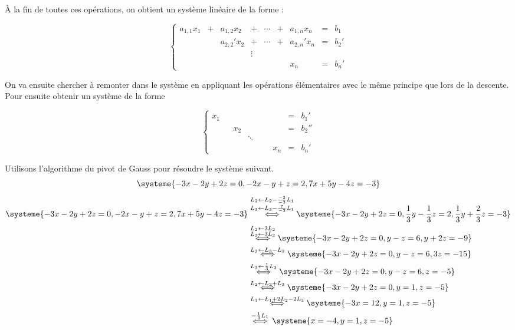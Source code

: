 \`A la fin de toutes ces opérations, on obtient un système linéaire de la forme :

\[
\left\{
\begin{array}{rrrrrrrrr}
	a_{1,1} x_1 & + & a_{1,2} x_2  & + & \cdots & + & a_{1,n} x_n  & = & b_1  \\
	            &   & a_{2,2}' x_2 & + & \cdots & + & a_{2,n}' x_n & = & b_2' \\
	            &   &              & \vdots  &  &   &              &   &      \\
	            &   &              &   &        &   & x_n          & = & b_n'
\end{array}
\right.
\]

On va ensuite chercher à remonter dans le système en appliquant les opérations élémentaires avec le même principe que lors de la descente. Pour ensuite obtenir un système de la forme 

\[
\left\{
\begin{array}{ccccccccc}
	x_1 &  &     &        &  &  &     & = & b_1'  \\
	    &  & x_2 &        &  &  &     & = & b_2'' \\
	    &  &     & \ddots &  &  &     &   &       \\
	    &  &     &        &  &  & x_n & = & b_n'
\end{array}
\right.
\]

\begin{example}
	Utilisons l'algorithme du pivot de Gauss pour résoudre le système suivant.
	\[
	\systeme{
	-3x -2y + 2z = 0,
	-2x -y + z = 2,
	7x + 5y - 4z = -3
	} 
	\]
	\begin{align*}
		\systeme{
			-3x -2y + 2z = 0,
			-2x -y + z = 2,
			7x + 5y - 4z = -3
		} 
		&\overset{\substack{L_2 \leftarrow L_2 - \frac{-2}{-3} L_1 \\ L_3 \leftarrow L_3 - \frac{7}{-3} L_1 }}{\iff}
		\systeme{
			-3x -2y + 2z = 0, 
			\frac{1}{3}y - \frac{1}{3}z = 2,
			\frac{1}{3}y + \frac{2}{3}z = -3
		} 
		\\
		&\overset{\substack{L_2 \leftarrow 3 L_2 \\ L_3 \leftarrow 3 L_3}}{\iff} 
		\systeme{
			-3x -2y + 2z = 0,
			y - z = 6,
			y + 2z = -9
		}
		\\
		&\overset{L_3 \leftarrow L_3 - L_2}{\iff}
		\systeme{
			-3x -2y + 2z = 0,
			y - z = 6,
			3z = -15
		}
		\\
		&\overset{L_3 \leftarrow \frac{1}{3} L_3}{\iff}
		\systeme{
			-3x -2y + 2z = 0,
			y - z = 6,
			z = -5
		}
		\\
		&\overset{L_2 \leftarrow L_2 + L_3}{\iff}
		\systeme{
			-3x - 2y + 2z = 0,
			y = 1,
			z = -5
		}
		\\
		&\overset{L_1 \leftarrow L_1 + 2 L_2 - 2 L_3}{\iff}
		\systeme{
			-3x = 12,
			y = 1,
			z = -5
		}
		\\
		&\overset{-\frac{1}{3}L_1}{\iff}
		\systeme{
		x = -4,
		y = 1,
		z = -5
		}
	\end{align*}
\end{example}

